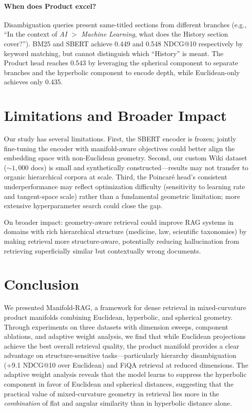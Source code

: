 \documentclass{article}
\begin{document}
\paragraph{When does Product excel?}
Disambiguation queries present same-titled sections from different branches (e.g., ``In the context of \emph{AI $>$ Machine Learning}, what does the History section cover?''). BM25 and SBERT achieve 0.449 and 0.548 NDCG@10 respectively by keyword matching, but cannot distinguish which ``History'' is meant. The Product head reaches 0.543 by leveraging the spherical component to separate branches and the hyperbolic component to encode depth, while Euclidean-only achieves only 0.435.

\section{Limitations and Broader Impact}

Our study has several limitations. First, the SBERT encoder is frozen; jointly fine-tuning the encoder with manifold-aware objectives could better align the embedding space with non-Euclidean geometry. Second, our custom Wiki dataset (${\sim}1{,}000$ docs) is small and synthetically constructed---results may not transfer to organic hierarchical corpora at scale. Third, the Poincar\'e head's consistent underperformance may reflect optimization difficulty (sensitivity to learning rate and tangent-space scale) rather than a fundamental geometric limitation; more extensive hyperparameter search could close the gap.

On broader impact: geometry-aware retrieval could improve RAG systems in domains with rich hierarchical structure (medicine, law, scientific taxonomies) by making retrieval more structure-aware, potentially reducing hallucination from retrieving superficially similar but contextually wrong documents.

\section{Conclusion}

We presented Manifold-RAG, a framework for dense retrieval in mixed-curvature product manifolds combining Euclidean, hyperbolic, and spherical geometry. Through experiments on three datasets with dimension sweeps, component ablations, and adaptive weight analysis, we find that while Euclidean projections achieve the best overall retrieval quality, the product manifold provides a clear advantage on structure-sensitive tasks---particularly hierarchy disambiguation (+9.1 NDCG@10 over Euclidean) and FiQA retrieval at reduced dimensions. The adaptive weight analysis reveals that the model learns to suppress the hyperbolic component in favor of Euclidean and spherical distances, suggesting that the practical value of mixed-curvature geometry in retrieval lies more in the \emph{combination} of flat and angular similarity than in hyperbolic distance alone.
\end{document}
